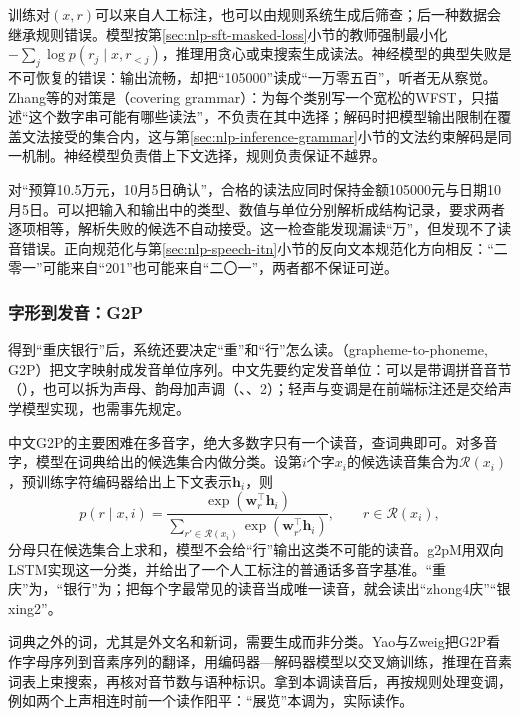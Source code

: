 训练对$(x,r)$可以来自人工标注，也可以由规则系统生成后筛查；后一种数据会继承规则错误。模型按第\ref{sec:nlp-sft-masked-loss}小节的教师强制最小化$-\sum_j\log p(r_j\mid x,r_{<j})$，推理用贪心或束搜索生成读法。神经模型的典型失败是不可恢复的错误：输出流畅，却把“105000”读成“一万零五百”，听者无从察觉。Zhang等的对策是（covering grammar）：为每个类别写一个宽松的WFST，只描述“这个数字串可能有哪些读法”，不负责在其中选择；解码时把模型输出限制在覆盖文法接受的集合内，这与第\ref{sec:nlp-inference-grammar}小节的文法约束解码是同一机制。神经模型负责借上下文选择，规则负责保证不越界。

对“预算10.5万元，10月5日确认”，合格的读法应同时保持金额105000元与日期10月5日。可以把输入和输出中的类型、数值与单位分别解析成结构记录，要求两者逐项相等，解析失败的候选不自动接受。这一检查能发现漏读“万”，但发现不了读音错误。正向规范化与第\ref{sec:nlp-speech-itn}小节的反向文本规范化方向相反：“二零一”可能来自“201”也可能来自“二〇一”，两者都不保证可逆。

\subsubsection{字形到发音：G2P}
\label{sec:nlp-speech-g2p}

得到“重庆银行”后，系统还要决定“重”和“行”怎么读。（grapheme-to-phoneme, G2P）把文字映射成发音单位序列。中文先要约定发音单位：可以是带调拼音音节（），也可以拆为声母、韵母加声调（、、2）；轻声与变调是在前端标注还是交给声学模型实现，也需事先规定。

中文G2P的主要困难在多音字，绝大多数字只有一个读音，查词典即可。对多音字，模型在词典给出的候选集合内做分类。设第$i$个字$x_i$的候选读音集合为$\mathcal{R}(x_i)$，预训练字符编码器给出上下文表示$\bm{h}_i$，则
\begin{equation}
  p(r\mid x,i)=\frac{\exp(\bm{w}_r^{\top}\bm{h}_i)}{\sum_{r'\in\mathcal{R}(x_i)}\exp(\bm{w}_{r'}^{\top}\bm{h}_i)},
  \qquad r\in\mathcal{R}(x_i),
  \label{eq:nlp-speech-polyphone}
\end{equation}
分母只在候选集合上求和，模型不会给“行”输出这类不可能的读音。g2pM用双向LSTM实现这一分类，并给出了一个人工标注的普通话多音字基准。“重庆”为，“银行”为；把每个字最常见的读音当成唯一读音，就会读出“zhong4庆”“银xing2”。

词典之外的词，尤其是外文名和新词，需要生成而非分类。Yao与Zweig把G2P看作字母序列到音素序列的翻译，用编码器—解码器模型以交叉熵训练，推理在音素词表上束搜索，再核对音节数与语种标识。拿到本调读音后，再按规则处理变调，例如两个上声相连时前一个读作阳平：“展览”本调为，实际读作。

